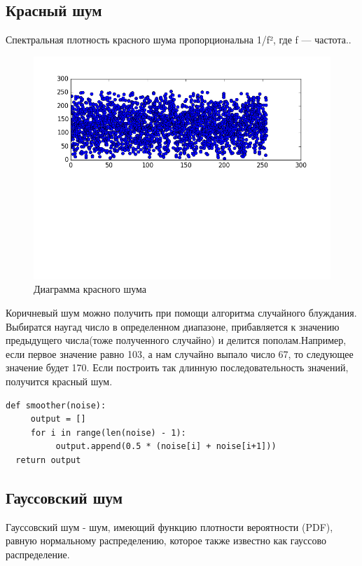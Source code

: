 \subsection{Красный шум}
Спектральная плотность красного шума пропорциональна 1/f², где f — частота..																									\begin{figure}[h]
	\centering
 \includegraphics[width=\textwidth ]{img/3_red_noise.png}
	\caption{Диаграмма красного шума }
	\label{fig:spire04}
\end{figure} 
Коричневый шум можно получить при помощи алгоритма случайного блуждания. Выбиратся наугад число в определенном диапазоне,
  прибавляется к значению предыдущего числа(тоже полученного случайно) и делится пополам.Например, если первое значение равно 103, а нам случайно выпало число 67, то следующее значение будет 170. Если  построить так длинную последовательность значений, получится красный шум. 
  \begin{lstlisting}[style=pseudocode,caption={Получение коричневого шума}] 
  def smoother(noise):
     output = []
     for i in range(len(noise) - 1):
          output.append(0.5 * (noise[i] + noise[i+1]))
  return output
  \end{lstlisting}
 \subsection{Гауссовский шум}
 
 Гауссовский шум  - шум, имеющий функцию плотности вероятности (PDF), равную нормальному распределению, которое также известно как гауссово распределение. 

